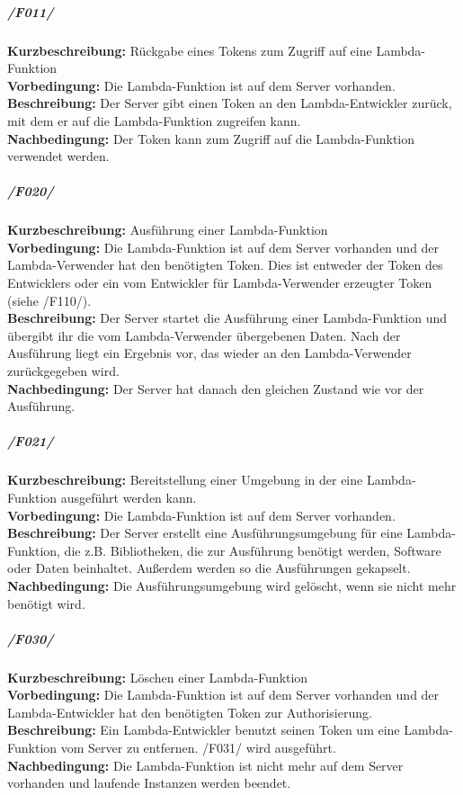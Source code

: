 \documentclass[a4paper,20pt,oneside]{book}
\begin{document}
\subparagraph{/F011/}
\textbf{Kurzbeschreibung:} Rückgabe eines \Glspl{Token} zum Zugriff auf eine \Gls{Lambda-Funktion}
\\
\textbf{Vorbedingung:} Die \Gls{Lambda-Funktion} ist auf dem \Gls{Server} vorhanden.
\\
\textbf{Beschreibung:} Der \Gls{Server} gibt einen \Gls{Token} an den \Gls{Lambda-Entwickler} zurück, mit dem er auf die \Gls{Lambda-Funktion} zugreifen kann.
\\
\textbf{Nachbedingung:} Der \Gls{Token} kann zum Zugriff auf die \Gls{Lambda-Funktion} verwendet werden.

\subparagraph{/F020/}
\textbf{Kurzbeschreibung:} Ausführung einer \Gls{Lambda-Funktion}
\\
\textbf{Vorbedingung:} Die \Gls{Lambda-Funktion} ist auf dem \Gls{Server} vorhanden und der \Gls{Lambda-Verwender} hat den benötigten \Gls{Token}. Dies ist entweder der \Gls{Token} des Entwicklers oder ein vom Entwickler für \Gls{Lambda-Verwender} erzeugter \Gls{Token} (siehe /F110/).
\\
\textbf{Beschreibung:} Der \Gls{Server} startet die Ausführung einer \Gls{Lambda-Funktion} und übergibt ihr die vom \Gls{Lambda-Verwender} übergebenen Daten. Nach der Ausführung liegt ein Ergebnis vor, das wieder an den \gls{Lambda-Verwender} zurückgegeben wird.
\\
\textbf{Nachbedingung:} Der \Gls{Server} hat danach den gleichen Zustand wie vor der Ausführung. 

\subparagraph{/F021/}
\textbf{Kurzbeschreibung:} Bereitstellung einer Umgebung in der eine \Gls{Lambda-Funktion} ausgeführt werden kann.
\\
\textbf{Vorbedingung:} Die \Gls{Lambda-Funktion} ist auf dem \Gls{Server} vorhanden.
\\
\textbf{Beschreibung:} Der \Gls{Server} erstellt eine Ausführungsumgebung für eine \Gls{Lambda-Funktion}, die z.B. Bibliotheken, die zur Ausführung benötigt werden, Software oder Daten beinhaltet. Außerdem werden so die Ausführungen \gls{gekapselt}. 
\\
\textbf{Nachbedingung:} Die Ausführungsumgebung wird gelöscht, wenn sie nicht mehr benötigt wird.

\subparagraph{/F030/}
\textbf{Kurzbeschreibung:} Löschen einer \Gls{Lambda-Funktion}
\\
\textbf{Vorbedingung:} Die \Gls{Lambda-Funktion} ist auf dem \Gls{Server} vorhanden und der \Gls{Lambda-Entwickler} hat den benötigten \Gls{Token} zur Authorisierung.
\\
\textbf{Beschreibung:} Ein \Gls{Lambda-Entwickler} benutzt seinen \Gls{Token} um eine \Gls{Lambda-Funktion} vom \Gls{Server} zu entfernen. /F031/ wird ausgeführt.
\\
\textbf{Nachbedingung:} Die \Gls{Lambda-Funktion} ist nicht mehr auf dem \Gls{Server} vorhanden und laufende Instanzen werden beendet.
\end{document}
